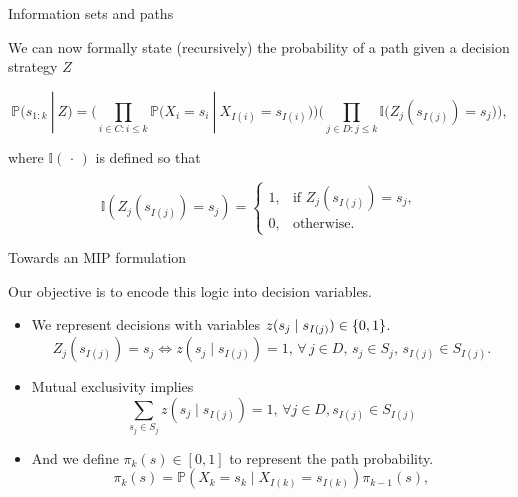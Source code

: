 \documentclass[mathserif,aspectratio=149]{beamer}
\begin{document}
\begin{frame}{Information sets and paths}

	We can now formally state (recursively) the \alert{probability of a path given a decision strategy} $Z$
	\vspace{-12pt}
	
	{\small
	\begin{equation*} \label{path_probabilities}
	\mathbb{P}(s_{1:k}~|~Z)= \bigg( \prod_{i \in C : i \leq k} \mathbb{P} \big(X_i=s_i~|~X_{I(i)} = s_{I(i)} \big) \bigg) \bigg( \prod_{j \in D : j \leq k} \mathbb{I} \big( Z_j(s_{I(j)})=s_j \big) \bigg), 
	\end{equation*}
	}
	
	where $\mathbb{I}(\,\cdot\,)$ is defined so that 
	
	\begin{equation*}
	    \mathbb{I}(Z_j(s_{I(j)}) = s_j) = \begin{cases}1, &\text{if } Z_j(s_{I(j)})=s_j, \\
	                                       0, &\text{otherwise.} \end{cases}
	\end{equation*}

\end{frame}



\begin{frame}{Towards an MIP formulation}

	Our objective is to encode this logic into \alert{decision variables}.
	\begin{itemize}[<+->]
	\item We represent decisions with \alert{variables} $z(s_j \mid s_{I(j)}) \in \left\{ 0,1 \right \}$.
	\begin{equation} \label{eq5}
	Z_j(s_{I(j)}) = s_j \iff z(s_j \mid s_{I(j)}) = 1, \, \forall \,j \in D,\, s_j  \in S_j, \,s_{I(j)} \in S_{I(j)}. 
	\end{equation} 
	\item Mutual exclusivity implies
	\begin{equation} \label{eq6}
	\sum_{s_j \in S_j} z(s_j \mid s_{I(j)}) = 1, \, \forall j \in D, s_{I(j)} \in S_{I(j)}	
	\end{equation}
	\item And we define $\pi_k(s) \in [0,1]$ to represent the \alert{path probability}.
	\begin{equation} \label{eq7}
	\pi_k(s) = \mathbb{P}\left(X_k = s_k \mid X_{I(k)} = s_{I(k)}\right) \pi_{k-1}(s), 
	\end{equation}
	\end{itemize}
	
	\vspace{-21pt}
\end{frame}
\end{document}
